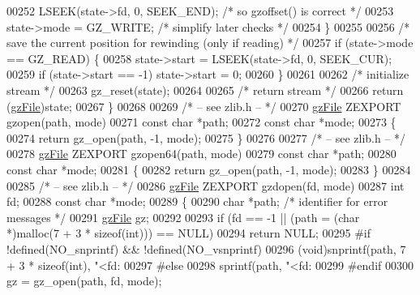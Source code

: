 \begin{DoxyCode}
{{00252         LSEEK(state->fd, 0, SEEK\_END);  \textcolor{comment}{/* so gzoffset() is correct */}
00253         state->mode = GZ\_WRITE;         \textcolor{comment}{/* simplify later checks */}
00254     \}
00255 
00256     \textcolor{comment}{/* save the current position for rewinding (only if reading) */}
00257     \textcolor{keywordflow}{if} (state->mode == GZ\_READ) \{
00258         state->start = LSEEK(state->fd, 0, SEEK\_CUR);
00259         \textcolor{keywordflow}{if} (state->start == -1) state->start = 0;
00260     \}
00261 
00262     \textcolor{comment}{/* initialize stream */}
00263     gz\_reset(state);
00264 
00265     \textcolor{comment}{/* return stream */}
00266     \textcolor{keywordflow}{return} (\hyperlink{structgz_file__s}{gzFile})state;
00267 \}
00268 
00269 \textcolor{comment}{/* -- see zlib.h -- */}
00270 \hyperlink{structgz_file__s}{gzFile} ZEXPORT gzopen(path, mode)
00271     \textcolor{keyword}{const} \textcolor{keywordtype}{char} *path;
00272     \textcolor{keyword}{const} \textcolor{keywordtype}{char} *mode;
00273 \{
00274     \textcolor{keywordflow}{return} gz\_open(path, -1, mode);
00275 \}
00276 
00277 \textcolor{comment}{/* -- see zlib.h -- */}
00278 \hyperlink{structgz_file__s}{gzFile} ZEXPORT gzopen64(path, mode)
00279     \textcolor{keyword}{const} \textcolor{keywordtype}{char} *path;
00280     \textcolor{keyword}{const} \textcolor{keywordtype}{char} *mode;
00281 \{
00282     \textcolor{keywordflow}{return} gz\_open(path, -1, mode);
00283 \}
00284 
00285 \textcolor{comment}{/* -- see zlib.h -- */}
00286 \hyperlink{structgz_file__s}{gzFile} ZEXPORT gzdopen(fd, mode)
00287     \textcolor{keywordtype}{int} fd;
00288     \textcolor{keyword}{const} \textcolor{keywordtype}{char} *mode;
00289 \{
00290     \textcolor{keywordtype}{char} *path;         \textcolor{comment}{/* identifier for error messages */}
00291     \hyperlink{structgz_file__s}{gzFile} gz;
00292 
00293     \textcolor{keywordflow}{if} (fd == -1 || (path = (\textcolor{keywordtype}{char} *)malloc(7 + 3 * \textcolor{keyword}{sizeof}(\textcolor{keywordtype}{int}))) == NULL)
00294         \textcolor{keywordflow}{return} NULL;
00295 \textcolor{preprocessor}{#if !defined(NO\_snprintf) && !defined(NO\_vsnprintf)}
00296     (void)snprintf(path, 7 + 3 * \textcolor{keyword}{sizeof}(\textcolor{keywordtype}{int}), \textcolor{stringliteral}{"<fd:%
00297 \textcolor{preprocessor}{#else}
00298     sprintf(path, \textcolor{stringliteral}{"<fd:%
00299 \textcolor{preprocessor}{#endif}
00300     gz = gz\_open(path, fd, mode);
}}}}
\end{DoxyCode}
